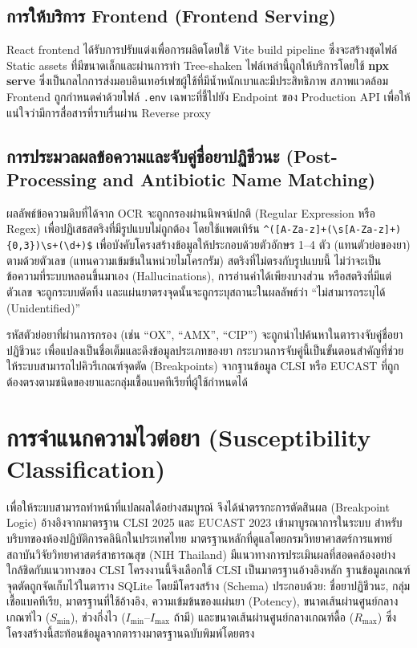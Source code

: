 \subsection{การให้บริการ Frontend (Frontend Serving)}

React frontend ได้รับการปรับแต่งเพื่อการผลิตโดยใช้ Vite build pipeline ซึ่งจะสร้างชุดไฟล์ Static assets ที่มีขนาดเล็กและผ่านการทำ Tree-shaken ไฟล์เหล่านี้ถูกให้บริการโดยใช้ \textbf{npx serve} ซึ่งเป็นกลไกการส่งมอบอินเทอร์เฟซผู้ใช้ที่มีน้ำหนักเบาและมีประสิทธิภาพ สภาพแวดล้อม Frontend ถูกกำหนดค่าด้วยไฟล์ \texttt{.env} เฉพาะที่ชี้ไปยัง Endpoint ของ Production API เพื่อให้แน่ใจว่ามีการสื่อสารที่ราบรื่นผ่าน Reverse proxy

\subsection{การประมวลผลข้อความและจับคู่ชื่อยาปฏิชีวนะ (Post-Processing and Antibiotic Name Matching)}

ผลลัพธ์ข้อความดิบที่ได้จาก OCR จะถูกกรองผ่านนิพจน์ปกติ (Regular Expression หรือ Regex) เพื่อปฏิเสธสตริงที่มีรูปแบบไม่ถูกต้อง โดยใช้แพตเทิร์น \texttt{\^{}([A-Za-z]+(\textbackslash{}s[A-Za-z]+)\{0,3\})\textbackslash{}s+(\textbackslash{}d+)\$} เพื่อบังคับโครงสร้างข้อมูลให้ประกอบด้วยตัวอักษร 1--4 ตัว (แทนตัวย่อของยา) ตามด้วยตัวเลข (แทนความเข้มข้นในหน่วยไมโครกรัม) สตริงที่ไม่ตรงกับรูปแบบนี้ ไม่ว่าจะเป็นข้อความที่ระบบหลอนขึ้นมาเอง (Hallucinations), การอ่านค่าได้เพียงบางส่วน หรือสตริงที่มีแต่ตัวเลข จะถูกระบบตัดทิ้ง และแผ่นยาตรงจุดนั้นจะถูกระบุสถานะในผลลัพธ์ว่า ``ไม่สามารถระบุได้ (Unidentified)''

รหัสตัวย่อยาที่ผ่านการกรอง (เช่น ``OX'', ``AMX'', ``CIP'') จะถูกนำไปค้นหาในตารางจับคู่ชื่อยาปฏิชีวนะ เพื่อแปลงเป็นชื่อเต็มและดึงข้อมูลประเภทของยา กระบวนการจับคู่นี้เป็นขั้นตอนสำคัญที่ช่วยให้ระบบสามารถไปคิวรีเกณฑ์จุดตัด (Breakpoints) จากฐานข้อมูล CLSI หรือ EUCAST ที่ถูกต้องตรงตามชนิดของยาและกลุ่มเชื้อแบคทีเรียที่ผู้ใช้กำหนดได้

\section{การจำแนกความไวต่อยา (Susceptibility Classification)}

เพื่อให้ระบบสามารถทำหน้าที่แปลผลได้อย่างสมบูรณ์ จึงได้นำตรรกะการตัดสินผล (Breakpoint Logic) อ้างอิงจากมาตรฐาน CLSI 2025 \cite{clsi2025} และ EUCAST 2023 \cite{eucast2023} เข้ามาบูรณาการในระบบ สำหรับบริบทของห้องปฏิบัติการคลินิกในประเทศไทย มาตรฐานหลักที่ดูแลโดยกรมวิทยาศาสตร์การแพทย์ สถาบันวิจัยวิทยาศาสตร์สาธารณสุข (NIH Thailand) \cite{dmsc_nih} มีแนวทางการประเมินผลที่สอดคล้องอย่างใกล้ชิดกับแนวทางของ CLSI โครงงานนี้จึงเลือกใช้ CLSI เป็นมาตรฐานอ้างอิงหลัก ฐานข้อมูลเกณฑ์จุดตัดถูกจัดเก็บไว้ในตาราง SQLite โดยมีโครงสร้าง (Schema) ประกอบด้วย: ชื่อยาปฏิชีวนะ, กลุ่มเชื้อแบคทีเรีย, มาตรฐานที่ใช้อ้างอิง, ความเข้มข้นของแผ่นยา (Potency), ขนาดเส้นผ่านศูนย์กลางเกณฑ์ไว ($S_{\min}$), ช่วงกึ่งไว ($I_{\min}$--$I_{\max}$ ถ้ามี) และขนาดเส้นผ่านศูนย์กลางเกณฑ์ดื้อ ($R_{\max}$) ซึ่งโครงสร้างนี้สะท้อนข้อมูลจากตารางมาตรฐานฉบับพิมพ์โดยตรง


